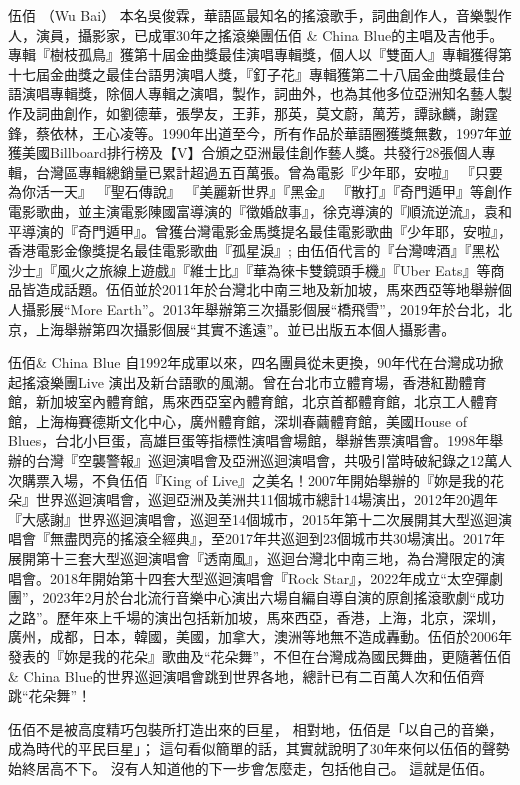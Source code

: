 \documentclass[UTF8,a4paper,oneside,twocolumn,12pt]{ctexbook}
\begin{document}
伍佰 （Wu Bai）
本名吳俊霖，華語區最知名的搖滾歌手，詞曲創作人，音樂製作人，演員，攝影家，已成軍30年之搖滾樂團伍佰 \& China Blue的主唱及吉他手。專輯『樹枝孤鳥』獲第十屆金曲獎最佳演唱專輯獎，個人以『雙面人』專輯獲得第十七屆金曲獎之最佳台語男演唱人獎，『釘子花』專輯獲第二十八屆金曲獎最佳台語演唱專輯獎，除個人專輯之演唱，製作，詞曲外，也為其他多位亞洲知名藝人製作及詞曲創作，如劉德華，張學友，王菲，那英，莫文蔚，萬芳，譚詠麟，謝霆鋒，蔡依林，王心凌等。1990年出道至今，所有作品於華語圈獲獎無數，1997年並獲美國Billboard排行榜及【V】合頒之亞洲最佳創作藝人獎。共發行28張個人專輯，台灣區專輯總銷量已累計超過五百萬張。曾為電影『少年耶，安啦』 『只要為你活一天』 『聖石傳說』 『美麗新世界』『黑金』 『散打』『奇門遁甲』等創作電影歌曲，並主演電影陳國富導演的『徵婚啟事』，徐克導演的『順流逆流』，袁和平導演的『奇門遁甲』。曾獲台灣電影金馬獎提名最佳電影歌曲『少年耶，安啦』，香港電影金像獎提名最佳電影歌曲『孤星淚』; 由伍佰代言的『台灣啤酒』『黑松沙士』『風火之旅線上遊戲』『維士比』『華為徠卡雙鏡頭手機』『Uber Eats』等商品皆造成話題。伍佰並於2011年於台灣北中南三地及新加坡，馬來西亞等地舉辦個人攝影展“More Earth”。2013年舉辦第三次攝影個展“橋飛雪”，2019年於台北，北京，上海舉辦第四次攝影個展“其實不遙遠”。並已出版五本個人攝影書。

伍佰\& China Blue 自1992年成軍以來，四名團員從未更換，90年代在台灣成功掀起搖滾樂團Live 演出及新台語歌的風潮。曾在台北市立體育場，香港紅勘體育館，新加坡室內體育館，馬來西亞室內體育館，北京首都體育館，北京工人體育館，上海梅賽德斯文化中心，廣州體育館，深圳春繭體育館，美國House of Blues，台北小巨蛋，高雄巨蛋等指標性演唱會場館，舉辦售票演唱會。1998年舉辦的台灣『空襲警報』巡迴演唱會及亞洲巡迴演唱會，共吸引當時破紀錄之12萬人次購票入場，不負伍佰『King of Live』之美名！2007年開始舉辦的『妳是我的花朵』世界巡迴演唱會，巡迴亞洲及美洲共11個城市總計14場演出，2012年20週年『大感謝』世界巡迴演唱會，巡迴至14個城市，2015年第十二次展開其大型巡迴演唱會『無盡閃亮的搖滾全經典』，至2017年共巡迴到23個城市共30場演出。2017年展開第十三套大型巡迴演唱會『透南風』，巡迴台灣北中南三地，為台灣限定的演唱會。2018年開始第十四套大型巡迴演唱會『Rock Star』，2022年成立“太空彈劇團”，2023年2月於台北流行音樂中心演出六場自編自導自演的原創搖滾歌劇“成功之路”。歷年來上千場的演出包括新加坡，馬來西亞，香港，上海，北京，深圳，廣州，成都，日本，韓國，美國，加拿大，澳洲等地無不造成轟動。伍佰於2006年發表的『妳是我的花朵』歌曲及“花朵舞”，不但在台灣成為國民舞曲，更隨著伍佰\& China Blue的世界巡迴演唱會跳到世界各地，總計已有二百萬人次和伍佰齊跳“花朵舞”！

伍佰不是被高度精巧包裝所打造出來的巨星，
相對地，伍佰是「以自己的音樂，成為時代的平民巨星」；
這句看似簡單的話，其實就說明了30年來何以伍佰的聲勢始終居高不下。
沒有人知道他的下一步會怎麼走，包括他自己。
這就是伍佰。
\end{document}
